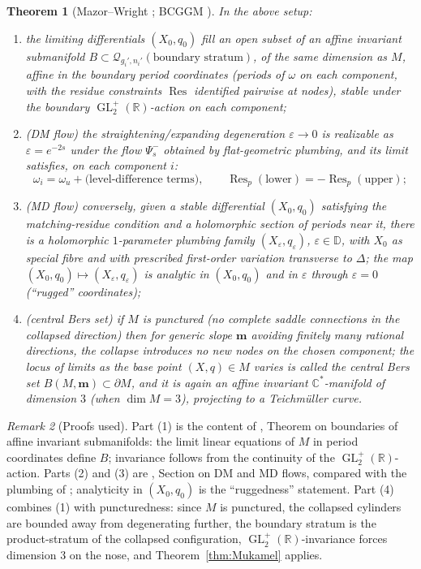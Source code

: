 \documentclass[11pt]{article}
\newcommand{\C}{\mathbb{C}}
\newcommand{\R}{\mathbb{R}}
\newcommand{\D}{\mathbb{D}}
\newcommand{\cQ}{\mathcal{Q}}
\DeclareMathOperator{\GL}{GL}
\DeclareMathOperator{\Res}{Res}
\newtheorem{thm}{Theorem}[section]
\theoremstyle{definition}
\theoremstyle{remark}
\newtheorem{rmk}[thm]{Remark}
\begin{document}
\begin{thm}[Mazor--Wright \cite{MW}; BCGGM \cite{BCGGM}]\label{thm:DMMD}
In the above setup:
\begin{enumerate}[label=(\arabic*)]
\item the limiting differentials $(X_0, q_0)$ fill an open subset of an
affine invariant submanifold $B \subset \cQ_{g_i',n_i'}(\text{boundary stratum})$,
of the same dimension as $M$, affine in the boundary period coordinates
(periods of $\omega$ on each component, with the residue constraints
$\Res$ identified pairwise at nodes), stable under the boundary
$\GL_2^+(\R)$-action on each component;
\item (DM flow) the straightening/expanding degeneration
$\varepsilon \to 0$ is realizable as $\varepsilon = e^{-2s}$ under the flow
$\Psi^-_s$ obtained by flat-geometric plumbing, and its limit satisfies, on
each component $i$:
\[
\omega_i = \omega_u + \text{(level-difference terms)}, \qquad
\Res_{p}(\text{lower}) = -\Res_{p}(\text{upper}) ;
\]
\item (MD flow) conversely, given a stable differential $(X_0,q_0)$
satisfying the matching-residue condition and a holomorphic section of
periods near it, there is a holomorphic $1$-parameter plumbing family
$(X_\varepsilon, q_\varepsilon)$, $\varepsilon \in \D$, with $X_0$ as
special fibre and with prescribed first-order variation transverse to
$\Delta$; the map $(X_0,q_0) \mapsto (X_\varepsilon, q_\varepsilon)$ is
analytic in $(X_0,q_0)$ and in $\varepsilon$ through $\varepsilon = 0$
(``rugged'' coordinates);
\item (central Bers set) if $M$ is punctured (no complete saddle
connections in the collapsed direction) then for generic slope
$\mathbf{m}$ avoiding finitely many rational directions, the collapse
introduces no new nodes on the chosen component;
the locus of limits as the base point $(X,q) \in M$ varies is called the
\emph{central Bers set} $B(M, \mathbf{m}) \subset \partial M$, and it is
again an affine invariant $\C^*$-manifold of dimension $3$ (when
$\dim M = 3$), projecting to a Teichm\"uller curve.
\end{enumerate}
\end{thm}

\begin{rmk}[Proofs used]
Part (1) is the content of \cite{MW}, Theorem on boundaries of affine
invariant submanifolds: the limit linear equations of $M$ in period
coordinates define $B$; invariance follows from the continuity of the
$\GL_2^+(\R)$-action. Parts (2) and (3) are \cite{MW}, Section on DM and
MD flows, compared with the plumbing of \cite{BCGGM}; analyticity in
$(X_0,q_0)$ is the ``ruggedness'' statement. Part (4) combines (1) with
puncturedness: since $M$ is punctured, the collapsed cylinders are bounded
away from degenerating further, the boundary stratum is the
product-stratum of the collapsed configuration, $\GL_2^+(\R)$-invariance
forces dimension $3$ on the nose, and Theorem~\ref{thm:Mukamel} applies.
\end{rmk}
\end{document}
